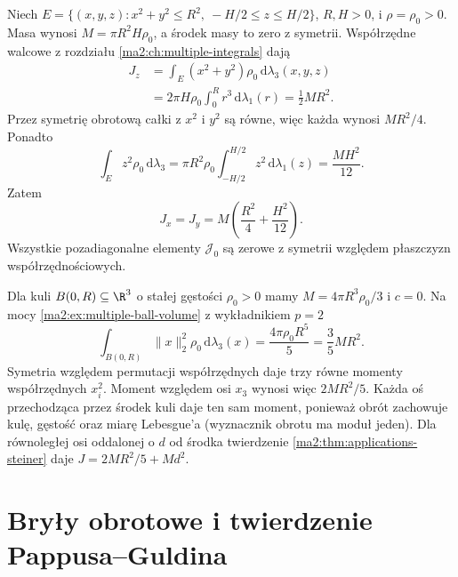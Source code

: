 \begin{przyklad}
\label{ma2:ex:applications-cylinder-inertia}
Niech $E=\{(x,y,z):x^2+y^2\le R^2,\ 
-H/2\le z\le H/2\}$, $R,H>0$,
i $\rho=\rho_0>0$.
Masa wynosi $M=\pi R^2H\rho_0$,
a środek masy to zero z symetrii.
Współrzędne walcowe z rozdziału
\ref{ma2:ch:multiple-integrals} dają
\[
 \begin{aligned}
 J_z&=\int_E(x^2+y^2)\rho_0\,
 \mathrm d\lambda_3(x,y,z)\\
 &=2\pi H\rho_0\int_0^Rr^3\,\mathrm d\lambda_1(r)
 =\frac12 MR^2.
 \end{aligned}
\]
Przez symetrię obrotową całki z $x^2$ i $y^2$
są równe, więc każda wynosi $MR^2/4$.
Ponadto
\[
 \int_E z^2\rho_0\,\mathrm d\lambda_3
 =\pi R^2\rho_0\int_{-H/2}^{H/2}z^2\,
 \mathrm d\lambda_1(z)=\frac{MH^2}{12}.
\]
Zatem
\[
 J_x=J_y=M\left(\frac{R^2}{4}+\frac{H^2}{12}\right).
\]
Wszystkie pozadiagonalne elementy $\mathcal J_0$
są zerowe z symetrii względem płaszczyzn
współrzędnościowych.
\end{przyklad}

\begin{przyklad}
\label{ma2:ex:applications-ball-inertia}
Dla kuli $B(0,R)\subseteq\R^3$ o stałej
gęstości $\rho_0>0$ mamy
$M=4\pi R^3\rho_0/3$ i $c=0$.
Na mocy \ref{ma2:ex:multiple-ball-volume}
z wykładnikiem $p=2$
\[
 \int_{B(0,R)}\|x\|_2^2\rho_0\,
 \mathrm d\lambda_3(x)=\frac{4\pi\rho_0R^5}{5}
 =\frac35MR^2.
\]
Symetria względem permutacji współrzędnych
daje trzy równe momenty współrzędnych $x_i^2$.
Moment względem osi $x_3$ wynosi więc
$2MR^2/5$. Każda oś przechodząca przez
środek kuli daje ten sam moment, ponieważ
obrót zachowuje kulę, gęstość oraz miarę
Lebesgue'a (wyznacznik obrotu ma moduł jeden).
Dla równoległej osi oddalonej o $d$ od środka
twierdzenie \ref{ma2:thm:applications-steiner}
daje $J=2MR^2/5+Md^2$.
\end{przyklad}

\section{Bryły obrotowe i twierdzenie Pappusa--Guldina}

